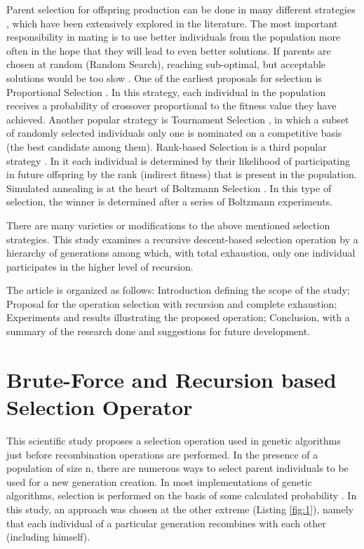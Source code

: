 \documentclass[graybox]{styles/svmult}
\begin{document}
Parent selection for offspring production can be done in many different strategies \cite{balabanov-05}, which have been extensively explored in the literature. The most important responsibility in mating is to use better individuals from the population more often in the hope that they will lead to even better solutions. If parents are chosen at random (Random Search), reaching sub-optimal, but acceptable solutions would be too slow \cite{wang-01}. One of the earliest proposals for selection is Proportional Selection \cite{back-01}. In this strategy, each individual in the population receives a probability of crossover proportional to the fitness value they have achieved. Another popular strategy is Tournament Selection \cite{miller-01}, in which a subset of randomly selected individuals only one is nominated on a competitive basis (the best candidate among them). Rank-based Selection is a third popular strategy \cite{grefenstette-01}. In it each individual is determined by their likelihood of participating in future offspring by the rank (indirect fitness) that is present in the population. Simulated annealing is at the heart of Boltzmann Selection \cite{goldberg-01}. In this type of selection, the winner is determined after a series of Boltzmann experiments.

There are many varieties or modifications to the above mentioned selection strategies. This study examines a recursive descent-based selection operation \cite{gelfand-01} by a hierarchy of generations among which, with total exhaustion, \cite{fellows-01} only one individual participates in the higher level of recursion.

The article is organized as follows: Introduction defining the scope of the study; Proposal for the operation selection with recursion and complete exhaustion; Experiments and results illustrating the proposed operation; Conclusion, with a summary of the research done and suggestions for future development.

\section{Brute-Force and Recursion based Selection Operator}
\label{sec:2}

This scientific study proposes a selection operation used in genetic algorithms just before recombination operations are performed. In the presence of a population of size n, there are numerous ways to select parent individuals to be used for a new generation creation. In most implementations of genetic algorithms, selection is performed on the basis of some calculated probability \cite{matsui-01}. In this study, an approach was chosen at the other extreme (Listing \ref{fig:1}), namely that each individual of a particular generation recombines with each other (including himself).
\end{document}

